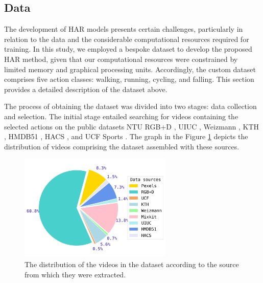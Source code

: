 \documentclass[mathematics,article,submit,pdftex,moreauthors]{Definitions/mdpi}
\begin{document}
\subsection{Data}
\label{subsec:data}

The development of HAR models presents certain challenges, particularly in relation to the data and the considerable computational resources required for training. In this study, we employed a bespoke dataset to develop the proposed HAR method, given that our computational resources were constrained by limited memory and graphical processing units. Accordingly, the custom dataset comprises five action classes: walking, running, cycling, and falling. This section provides a detailed description of the dataset above.

The process of obtaining the dataset was divided into two stages: data collection and selection. The initial stage entailed searching for videos containing the selected actions on the public datasets NTU RGB+D \cite{8713892}, UIUC \cite{10100742}, Weizmann \cite{ActionsAsSpaceTimeShapes_iccv05}, KTH \cite{1334462}, HMDB51 \cite{6126543}, HACS \cite{zhao2019hacs}, and UCF Sports \cite{soomro2012ucf101}. The graph in the Figure \ref{fig3} depicts the distribution of videos comprising the dataset assembled with these sources. 

\begin{figure}[ht]
\centering
    	
\includegraphics[width=0.65\textwidth]{Definitions/data_distrib_pie_sources.png}
    	
        \caption{The distribution of the videos in the dataset according to the source from which they were extracted.} \label{fig3}
        \end{figure}
\end{document}
